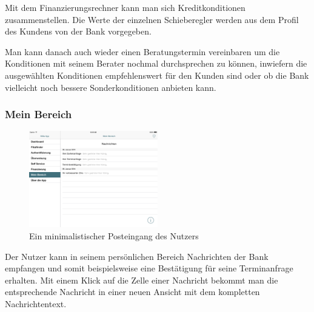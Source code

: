 	Mit dem Finanzierungsrechner kann man sich Kreditkonditionen zusammenstellen. Die Werte der einzelnen Schieberegler werden aus dem Profil des Kundens von der Bank vorgegeben.

	Man kann danach auch wieder einen Beratungstermin vereinbaren um die Konditionen mit seinem Berater nochmal durchsprechen zu können, inwiefern die ausgewählten Konditionen empfehlenswert für den Kunden sind oder ob die Bank vielleicht noch bessere Sonderkonditionen anbieten kann.

\subsubsection{Mein Bereich}

\begin{figure}
	\centering
  \includegraphics[width=0.5\textwidth]{Pictures/mbereichneu}
	\caption{Ein minimalistischer Posteingang des Nutzers\label{fig10}}
\end{figure}

	Der Nutzer kann in seinem persönlichen Bereich Nachrichten der Bank empfangen und somit beispielsweise eine Bestätigung für seine Terminanfrage erhalten. Mit einem Klick auf die Zelle einer Nachricht bekommt man die entsprechende Nachricht in einer neuen Ansicht mit dem kompletten Nachrichtentext.

